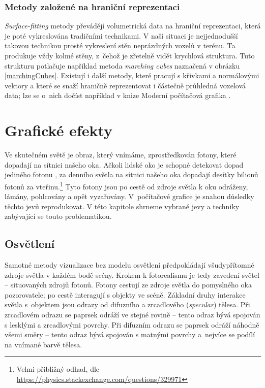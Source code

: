\subsection{Metody založené na hraniční reprezentaci}
\textit{Surface-fitting} metody převádějí volumetrická data na hraniční reprezentaci, která je poté vykreslována tradičními technikami. V naší situaci je nejjednodušší takovou technikou prosté vykreslení stěn neprázdných voxelů v terénu. Ta produkuje vždy kolmé stěny, z~čehož je zřetelně vidět krychlová struktura. Tuto strukturu potlačuje například metoda \textit{marching cubes} naznačená v obrázku \ref{marchingCubes}. Existují i další metody, které pracují s křivkami a normálovými vektory a které se snaží hraničně reprezentovat i částečně průhledná voxelová data; lze se o~nich dočíst například v knize Moderní počítačová grafika \cite{ZaraJiri2004Mpg}.


\chapter{Grafické efekty} \label{ch:graphicEffects}
Ve skutečném světě je obraz, který vnímáme, zprostředkován fotony, které dopadají na sítnici našeho oka. Ačkoli lidské oko je schopné detekovat dopad jediného fotonu \cite{TinsleyJonathan2016Ddoa}, za denního světla na sítnici našeho oka dopadají desítky bilionů fotonů za vteřinu.\footnote{Velmi přibližný odhad, dle \url{https://physics.stackexchange.com/questions/329971}} Tyto fotony jsou po cestě od zdroje světla k oku odráženy, lámány, pohlcovány a opět vyzařovány. V~počítačové grafice je snahou důsledky těchto jevů reprodukovat. V této kapitole shrneme vybrané jevy a techniky zabývající se touto problematikou.

\section{Osvětlení} \label{lighting}
Samotné metody vizualizace bez modelu osvětlení předpokládají všudypřítomné zdroje světla v každém bodě scény. Krokem k fotorealismu je tedy zavedení světel -- situovaných zdrojů fotonů. Fotony cestují ze zdroje světla do pomyslného oka pozorovatele; po cestě interagují s objekty ve scéně. Základní druhy interakce světla s~objektem jsou odrazy od difuzního a zrcadlového (\textit{specular}) tělesa. Při zrcadlovém odrazu se paprsek odráží ve stejné rovině -- tento odraz bývá spojován s lesklými a zrcadlovými povrchy. Při difuzním odrazu se paprsek odráží náhodně všemi směry -- tento odraz bývá spojován s matnými povrchy a~nejvíce se podílí na vnímané barvě tělesa.

